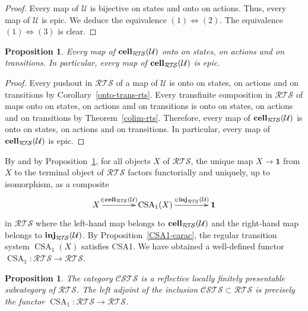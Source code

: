 \documentclass[a4paper,12pt]{amsart}
\newtheorem{prop}[thm]{Proposition}
\begin{document}
\begin{proof} Every map of $\mathcal{U}$ is bijective on states and onto
on actions.  Thus, every map of $\mathcal{U}$ is epic. We deduce
the equivalence $(1) \Leftrightarrow (2)$. The equivalence 
$(1) \Leftrightarrow (3)$ is clear. \end{proof}

\begin{prop} \label{epic_map} Every map of $\operatorname{{{\rm{\mathbf{{cell}}}}}}_{\mathcal{R\!T\!S}}(\mathcal{U})$ onto on
states, on actions and on transitions. In particular, every map of
$\operatorname{{{\rm{\mathbf{{cell}}}}}}_{\mathcal{R\!T\!S}}(\mathcal{U})$ is epic.  \end{prop}

\begin{proof} Every pushout in ${\mathcal{R\!T\!S}}$ of a map of $\mathcal{U}$ is onto on
states, on actions and on transitions by
Corollary~\ref{onto-trans-rts}. Every transfinite composition in
${\mathcal{R\!T\!S}}$ of maps onto on states, on actions and on transitions is onto
on states, on actions and on transitions by
Theorem~\ref{colim-rts}. Therefore, every map of
$\operatorname{{{\rm{\mathbf{{cell}}}}}}_{\mathcal{R\!T\!S}}(\mathcal{U})$ is onto on states, on actions and on
transitions. In particular, every map of $\operatorname{{{\rm{\mathbf{{cell}}}}}}_{\mathcal{R\!T\!S}}(\mathcal{U})$ is
epic.  \end{proof}

By \cite[Proposition~A.1]{biscsts1} and by Proposition~\ref{epic_map},
for all objects $X$ of ${\mathcal{R\!T\!S}}$, the unique map $X\to \mathbf{1}$ from
$X$ to the terminal object of ${\mathcal{R\!T\!S}}$ factors functorially and
uniquely, up to isomorphism, as a composite \[\xymatrix@C=4em{X {\ar@{->}[r]^-{{\in
    \operatorname{{{\rm{\mathbf{{cell}}}}}}_{\mathcal{R\!T\!S}}(\mathcal{U})}}}& \operatorname{CSA}_1(X) {\ar@{->}[r]^-{{\in
    \operatorname{{{\rm{\mathbf{{inj}}}}}}_{\mathcal{R\!T\!S}}(\mathcal{U})}}}& \mathbf{1}}\] in ${\mathcal{R\!T\!S}}$ where the
left-hand map belongs to $\operatorname{{{\rm{\mathbf{{cell}}}}}}_{\mathcal{R\!T\!S}}(\mathcal{U})$ and the right-hand
map belongs to $\operatorname{{{\rm{\mathbf{{inj}}}}}}_{\mathcal{R\!T\!S}}(\mathcal{U})$. By
Proposition~\ref{CSA1-carac}, the regular transition system
$\operatorname{CSA}_1(X)$ satisfies CSA1. We have obtained a well-defined functor
$\operatorname{CSA}_1:{\mathcal{R\!T\!S}} \to {\mathcal{R\!T\!S}}$.

\begin{prop} \label{csa1-reflective} The category ${\mathcal{C\!S\!T\!S}}$ is a reflective
locally finitely presentable subcategory of ${\mathcal{R\!T\!S}}$. The left adjoint
of the inclusion ${\mathcal{C\!S\!T\!S}} \subset {\mathcal{R\!T\!S}}$ is precisely the functor
$\operatorname{CSA}_1:{\mathcal{R\!T\!S}} \to {\mathcal{R\!T\!S}}$. \end{prop}
\end{document}
